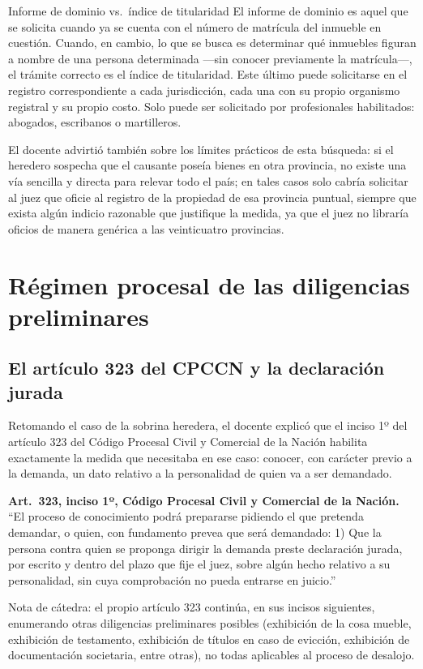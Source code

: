 \documentclass[12pt,oneside]{book}
\begin{document}
\begin{definition}{Informe de dominio vs.\ índice de titularidad}
El informe de dominio es aquel que se solicita cuando ya se cuenta con el número de matrícula del inmueble en cuestión. Cuando, en cambio, lo que se busca es determinar qué inmuebles figuran a nombre de una persona determinada —sin conocer previamente la matrícula—, el trámite correcto es el índice de titularidad. Este último puede solicitarse en el registro correspondiente a cada jurisdicción, cada una con su propio organismo registral y su propio costo. Solo puede ser solicitado por profesionales habilitados: abogados, escribanos o martilleros.
\end{definition}

El docente advirtió también sobre los límites prácticos de esta búsqueda: si el heredero sospecha que el causante poseía bienes en otra provincia, no existe una vía sencilla y directa para relevar todo el país; en tales casos solo cabría solicitar al juez que oficie al registro de la propiedad de esa provincia puntual, siempre que exista algún indicio razonable que justifique la medida, ya que el juez no libraría oficios de manera genérica a las veinticuatro provincias.

\chapter{Régimen procesal de las diligencias preliminares}

\section{El artículo 323 del CPCCN y la declaración jurada}

Retomando el caso de la sobrina heredera, el docente explicó que el inciso 1º del artículo 323 del Código Procesal Civil y Comercial de la Nación habilita exactamente la medida que necesitaba en ese caso: conocer, con carácter previo a la demanda, un dato relativo a la personalidad de quien va a ser demandado.

\begin{important}
\textbf{Art.\ 323, inciso 1º, Código Procesal Civil y Comercial de la Nación.} ``El proceso de conocimiento podrá prepararse pidiendo el que pretenda demandar, o quien, con fundamento prevea que será demandado: 1) Que la persona contra quien se proponga dirigir la demanda preste declaración jurada, por escrito y dentro del plazo que fije el juez, sobre algún hecho relativo a su personalidad, sin cuya comprobación no pueda entrarse en juicio.''

Nota de cátedra: el propio artículo 323 continúa, en sus incisos siguientes, enumerando otras diligencias preliminares posibles (exhibición de la cosa mueble, exhibición de testamento, exhibición de títulos en caso de evicción, exhibición de documentación societaria, entre otras), no todas aplicables al proceso de desalojo.
\end{important}
\end{document}
